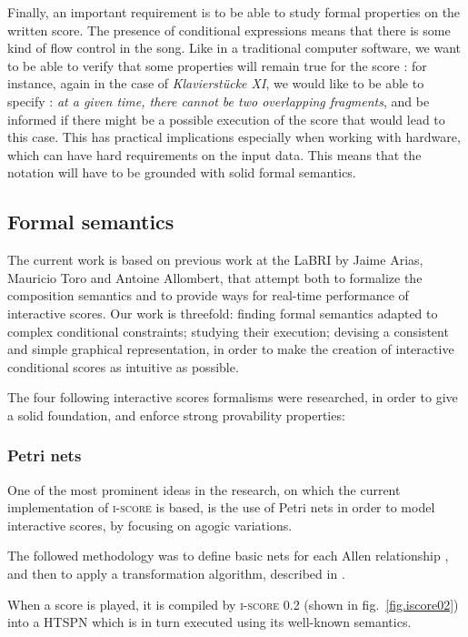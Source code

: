 \documentclass{article}
\newcommand{\klavierstuck}{\emph{Klavierstücke XI}}
\begin{document}
	Finally, an important requirement is to be able to study formal properties on the written score. The presence of conditional expressions means that there is some kind of flow control in the song. Like in a traditional computer software, we want to be able to verify that some properties will remain true for the score : for instance, again in the case of \klavierstuck{}, we would like to be able to specify : \emph{at a given time, there cannot be two overlapping fragments}, and be informed if there might be a possible execution of the score that would lead to this case. This has practical implications especially when working with hardware, which can have hard requirements on the input data. This means that the notation will have to be grounded with solid formal semantics.
	
	\subsection{Formal semantics}\label{section:formalismes}
	The current work is based on previous work at the LaBRI by Jaime Arias, Mauricio Toro and Antoine Allombert, that attempt both to formalize the composition semantics and to provide ways for real-time performance of interactive scores.
	Our work is threefold: finding formal semantics adapted to complex conditional constraints; studying their execution; devising a consistent and simple graphical representation, in order to make the creation of interactive conditional scores as intuitive as possible.
		
	The four following interactive scores formalisms were researched, in order to give a solid foundation, and enforce strong provability properties: 

	\subsubsection{Petri nets}
	One of the most prominent ideas in the research, on which the current implementation of \textsc{i-score} is based, is the use of Petri nets in order to model interactive scores, by focusing on agogic variations.
	
	The followed methodology was to define basic nets for each Allen relationship \cite{allen1983maintaining}, and then to apply a transformation algorithm, described in \cite[section 9.2]{allombert2009aspects}.
	 
	When a score is played, it is compiled by \textsc{i-score 0.2} (shown in fig.~\ref{fig.iscore02}) into a \ac{HTSPN} which is in turn executed using its well-known semantics.
	 
\end{document}
